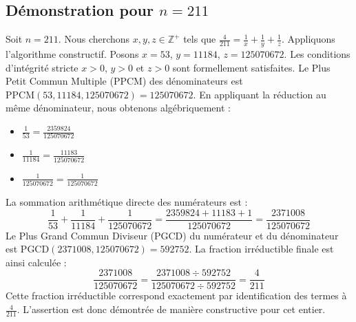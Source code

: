 \documentclass[11pt,a4paper]{article}
\begin{document}
\subsection{Démonstration pour $n = 211$}
Soit $n = 211$. Nous cherchons $x, y, z \in \mathbb{Z}^{+}$ tels que $\frac{4}{211} = \frac{1}{x} + \frac{1}{y} + \frac{1}{z}$.
Appliquons l'algorithme constructif. Posons $x = 53$, $y = 11184$, $z = 125070672$.
Les conditions d'intégrité stricte $x > 0$, $y > 0$ et $z > 0$ sont formellement satisfaites.
Le Plus Petit Commun Multiple (PPCM) des dénominateurs est $\text{PPCM}(53, 11184, 125070672) = 125070672$.
En appliquant la réduction au même dénominateur, nous obtenons algébriquement :
\begin{itemize}
    \item $\frac{1}{53} = \frac{2359824}{125070672}$
    \item $\frac{1}{11184} = \frac{11183}{125070672}$
    \item $\frac{1}{125070672} = \frac{1}{125070672}$
\end{itemize}
La sommation arithmétique directe des numérateurs est :
$$ \frac{1}{53} + \frac{1}{11184} + \frac{1}{125070672} = \frac{2359824 + 11183 + 1}{125070672} = \frac{2371008}{125070672} $$
Le Plus Grand Commun Diviseur (PGCD) du numérateur et du dénominateur est $\text{PGCD}(2371008, 125070672) = 592752$.
La fraction irréductible finale est ainsi calculée :
$$ \frac{2371008}{125070672} = \frac{2371008 \div 592752}{125070672 \div 592752} = \frac{4}{211} $$
Cette fraction irréductible correspond exactement par identification des termes à $\frac{4}{211}$. L'assertion est donc démontrée de manière constructive pour cet entier.
\end{document}
